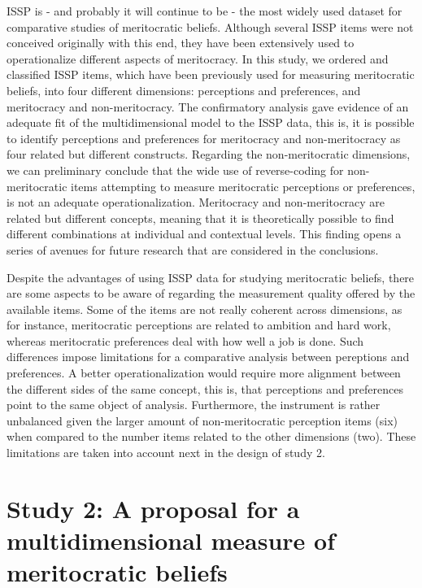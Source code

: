 \documentclass[
  10pt,
  a4paper,
]{article}
\begin{document}
ISSP is - and probably it will continue to be - the most widely used dataset for comparative studies of meritocratic beliefs. Although several ISSP items were not conceived originally with this end, they have been extensively used to operationalize different aspects of meritocracy. In this study, we ordered and classified ISSP items, which have been previously used for measuring meritocratic beliefs, into four different dimensions: perceptions and preferences, and meritocracy and non-meritocracy. The confirmatory analysis gave evidence of an adequate fit of the multidimensional model to the ISSP data, this is, it is possible to identify perceptions and preferences for meritocracy and non-meritocracy as four related but different constructs. Regarding the non-meritocratic dimensions, we can preliminary conclude that the wide use of reverse-coding for non-meritocratic items attempting to measure meritocratic perceptions or preferences, is not an adequate operationalization. Meritocracy and non-meritocracy are related but different concepts, meaning that it is theoretically possible to find different combinations at individual and contextual levels. This finding opens a series of avenues for future research that are considered in the conclusions.

Despite the advantages of using ISSP data for studying meritocratic beliefs, there are some aspects to be aware of regarding the measurement quality offered by the available items. Some of the items are not really coherent across dimensions, as for instance, meritocratic perceptions are related to ambition and hard work, whereas meritocratic preferences deal with how well a job is done. Such differences impose limitations for a comparative analysis between pereptions and preferences. A better operationalization would require more alignment between the different sides of the same concept, this is, that perceptions and preferences point to the same object of analysis. Furthermore, the instrument is rather unbalanced given the larger amount of non-meritocratic perception items (six) when compared to the number items related to the other dimensions (two). These limitations are taken into account next in the design of study 2.

\section{Study 2: A proposal for a multidimensional measure of meritocratic beliefs}\label{study-2-a-proposal-for-a-multidimensional-measure-of-meritocratic-beliefs}
\end{document}
